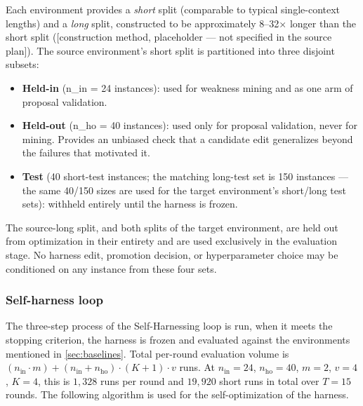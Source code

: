 \documentclass{article}
\begin{document}
Each environment provides a \textit{short} split (comparable to typical single-context lengths) and a \textit{long} split, constructed to be approximately 8–32× longer than the short split ([construction method, placeholder — not specified in the source plan]).
\newpage
The source environment's short split is partitioned into three disjoint subsets:

\begin{itemize}
    \item \textbf{Held-in} (n\_in = 24 instances): used for weakness mining and as one arm of proposal validation.
    \item \textbf{Held-out} (n\_ho = 40 instances): used only for proposal validation, never for mining. Provides an unbiased check that a candidate edit generalizes beyond the failures that motivated it.
    \item \textbf{Test} (40 short-test instances; the matching long-test set is 150 instances — the same 40/150 sizes are used for the target environment's short/long test sets): withheld entirely until the harness is frozen.
\end{itemize}
The source-long split, and both splits of the target environment, are held out from optimization in their entirety and are used exclusively in the evaluation stage. No harness edit, promotion decision, or hyperparameter choice may be conditioned on any instance from these four sets.

\subsubsection{Self-harness loop}
The three-step process of the Self-Harnessing loop is run,  when it meets the stopping criterion, the harness is frozen and evaluated against the environments mentioned in \ref{sec:baselines}.
\noindent
Total per-round evaluation volume is $(n_{\text{in}} \cdot m) + (n_{\text{in}} + n_{\text{ho}}) \cdot (K + 1) \cdot v$ runs. At $n_{\text{in}} = 24$, $n_{\text{ho}} = 40$, $m = 2$, $v = 4$, $K = 4$, this is $1{,}328$ runs per round and $19{,}920$ short runs in total over $T = 15$ rounds. The following algorithm is used for the self-optimization of the harness.

\vspace{0.5em}
\end{document}
